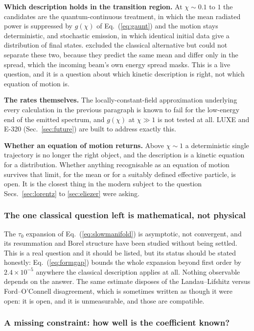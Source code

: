 \documentclass[preprint]{aastex701}
\newcommand{\taunought}{\tau_0}
\begin{document}
\textbf{Which description holds in the transition region.} At $\chi\sim0.1$ to
$1$ the candidates are the quantum-continuous treatment, in which the mean
radiated power is suppressed by $g(\chi)$ of Eq.~(\ref{eq:gaunt}) and the motion
stays deterministic, and stochastic emission, in which identical initial data
give a distribution of final states. \citet{los2026} excluded the classical
alternative but could not separate these two, because they predict the same mean
and differ only in the spread, which the incoming beam's own energy spread
masks. This is a live question, and it is a question about which kinetic
description is right, not which equation of motion is.

\textbf{The rates themselves.} The locally-constant-field approximation
underlying every calculation in the previous paragraph is known to fail for the
low-energy end of the emitted spectrum, and $g(\chi)$ at $\chi\gg1$ is not
tested at all. LUXE and E-320 (Sec.~\ref{sec:future}) are built to address
exactly this.

\textbf{Whether an equation of motion returns.} Above $\chi\sim1$ a deterministic
single trajectory is no longer the right object, and the description is a
kinetic equation for a distribution. Whether anything recognisable as an
equation of motion survives that limit, for the mean or for a suitably defined
effective particle, is open. It is the closest thing in the modern subject to
the question Secs.~\ref{sec:lorentz} to \ref{sec:eliezer} were asking.

\subsubsection{The one classical question left is mathematical, not physical}
\label{sec:openclassical}

The $\taunought$ expansion of Eq.~(\ref{eq:slowmanifold}) is asymptotic, not
convergent, and its resummation and Borel structure have been studied without
being settled. This is a real question and it should be listed, but its status
should be stated honestly: Eq.~(\ref{eq:formgap}) bounds the whole expansion
beyond first order by $2.4\times10^{-5}$ anywhere the classical description
applies at all. Nothing observable depends on the answer. The same estimate
disposes of the Landau--Lifshitz versus Ford--O'Connell disagreement, which is
sometimes written as though it were open: it is open, and it is unmeasurable,
and those are compatible.

\subsubsection{A missing constraint: how well is the coefficient known?}
\label{sec:unattempted}
\end{document}
